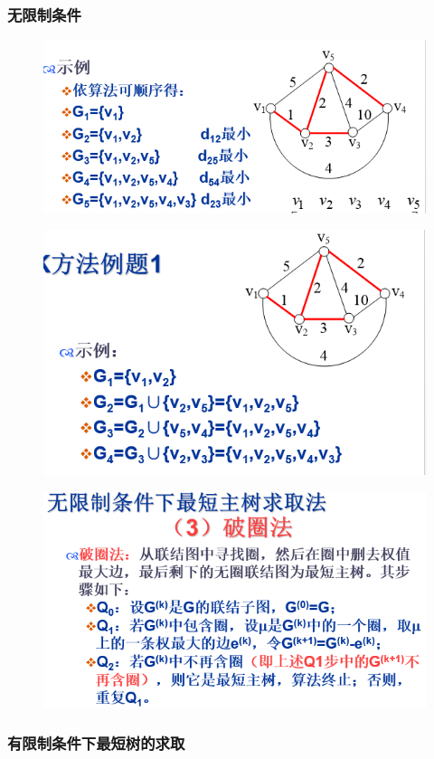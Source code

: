 \subsubsection{无限制条件}
\begin{figure}[H]
	\centering
	\includegraphics[width=0.7\linewidth]{figures/screenshot068}
	\caption{}
	\label{fig:screenshot068}
\end{figure}
\begin{figure}[H]
	\centering
	\includegraphics[width=0.7\linewidth]{figures/screenshot069}
	\caption{}
	\label{fig:screenshot069}
\end{figure}
\begin{figure}[H]
	\centering
	\includegraphics[width=0.7\linewidth]{figures/screenshot070}
	\caption{}
	\label{fig:screenshot070}
\end{figure}
\subsubsection{有限制条件下最短树的求取
}

